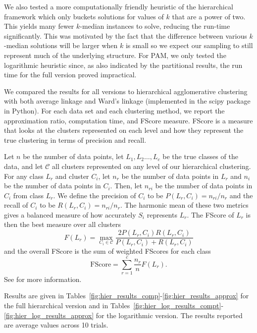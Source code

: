 \documentclass[conference, 10pt, final]{IEEEtran}
\begin{document}
We also tested a more computationally friendly heuristic of the hierarchical framework which only buckets solutions for values of $k$ that are a power of two. This yields many fewer $k$-median instances to solve, reducing the run-time significantly. This was motivated by the fact that the difference between various $k$-median solutions will be larger when $k$ is small so we expect our sampling to still represent much of the underlying structure. For PAM, we only tested the logarithmic heuristic since, as also indicated by the partitional results, the run time for the full version proved impractical. 

We compared the results for all versions to hierarchical agglomerative clustering with both average linkage and Ward's linkage (implemented in the scipy package in Python). 
For each data set and each clustering method, we report the approximation ratio, computation time, and FScore measure.  FScore is a measure that looks at the clusters represented on each level and how they represent the true clustering in terms of precision and recall. 

Let $n$ be the number of data points, let $L_1, L_2 \ldots, L_c$ be the true classes of the data, and let $\mathcal{C}$ all clusters represented on any level of our hierarchical clustering. For any class $L_r$ and cluster $C_i$, let $n_r$ be the number of data points in $L_r$ and $n_i$ be the number of data points in $C_i$. Then, let $n_{ri}$ be the number of data points in $C_i$ from class $L_r$. We define the precision of $C_i$ to be $P(L_r, C_i) = n_{ri}/n_r$ and the recall of $C_i$ to be $R(L_r, C_i) = n_{ri}/n_r$. The harmonic mean of these two metrics gives a balanced measure of how accurately $S_i$ represents $L_r$. The FScore of $L_r$ is then the best measure over all clusters
\begin{equation}
 F(L_r) = \max_{C_i \in \mathcal{C}}  \frac{ 2 P(L_r, C_i)  R(L_r, C_i)}{ P(L_r, C_i) + R(L_r, C_i)} 
\end{equation}
and the overall FScore is the sum of weighted FScores for each class
\begin{equation}
\mathrm{FScore} = \sum_{r=1}^c \frac{n_r}{n} F(L_r).
\end{equation}
See \cite{Larsen} for more information. 

Results are given in Tables~\ref{fig:hier_results_comp}-\ref{fig:hier_results_approx} for the full hierarchical version and in Tables~\ref{fig:hier_log_results_compt}-\ref{fig:hier_log_results_approx} for the logarithmic version. The results reported are average values across 10 trials.
\end{document}
